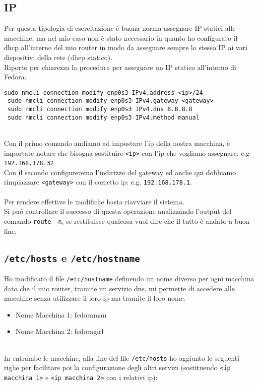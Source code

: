 \subsection{IP}

Per questa tipologia di esercitazione \`{e} buona norma assegnare IP statici alle macchine, ma nel mio caso non \`{e} stato necessario in quanto ho configurato il dhcp all'interno del mio router in modo da assegnare sempre lo stesso IP ai vari dispositivi della rete (dhcp statico).\\ %
Riporto per chiarezza la procedura per assegnare un IP statico all'interno di Fedora.

\begin{lstlisting}[style=cmd]
 sudo nmcli connection modify enp0s3 IPv4.address <ip>/24
 sudo nmcli connection modify enp0s3 IPv4.gateway <gateway>
 sudo nmcli connection modify enp0s3 IPv4.dns 8.8.8.8
 sudo nmcli connection modify enp0s3 IPv4.method manual
\end{lstlisting}
\ \\
Con il primo comando andiamo ad impostare l'ip della nostra macchina, \`{e} importate notare che bisogna sostituire \lstinline[style=cmd]|<ip>| con l'ip che vogliamo assegnare: e.g \lstinline[style=cmd]|192.168.178.32|.\\
Con il secondo configureremo l'indirizzo del gateway ed anche qui dobbiamo rimpiazzare \lstinline[style=cmd]|<gateway>| con il corretto ip: e.g. \lstinline[style=cmd]|192.168.178.1|.\\
\ \\
Per rendere effettive le modifiche basta riavviare il sistema.\\
Si pu\`{o} controllare il successo di questa operazione analizzando l'output del comando \lstinline[style=cmd]|route -n|, se restituisce qualcosa vuol dire che il tutto \`{e} andato a buon fine.

\subsection{\lstinline[style=cmd]|/etc/hosts| e \lstinline[style=cmd]|/etc/hostname|}

Ho modificato il file \lstinline[style=cmd]|/etc/hostname| definendo un nome diverso per ogni macchina dato che il mio router, tramite un servizio dns, mi permette di accedere alle macchine senza utilizzare il loro ip ma tramite il loro nome.

\begin{itemize}
	\item Nome Macchina 1: fedoraman
	\item Nome Macchina 2: fedoragirl
\end{itemize}
\ \\
In entrambe le macchine, alla fine del file \lstinline[style=cmd]|/etc/hosts| ho aggiunto le seguenti righe per facilitare poi la configurazione degli altri servizi (sostituendo \lstinline[style=cmd]|<ip macchina 1>| e \lstinline[style=cmd]|<ip macchina 2>| con i relativi ip):

